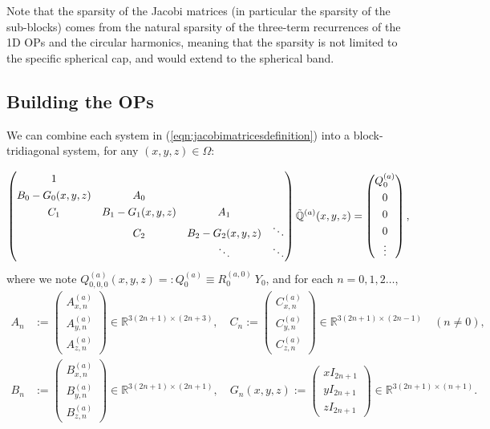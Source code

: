 \documentclass[11pt, oneside]{article}   	%
\newcommand{\R}{\mathbb{R}}
\newcommand{\genjac}{R}
\newcommand{\scop}{Q}
\newcommand{\scopa}{\scop^{(a)}}
\newcommand{\bigscopt}{\mathbb{\tilde{Q}}}
\newcommand{\bigscopta}{\bigscopt^{(a)}}
\newcommand{\ch}{Y}
\begin{document}
Note that the sparsity of the Jacobi matrices (in particular the sparsity of the sub-blocks) comes from the natural sparsity of the three-term recurrences of the 1D OPs and the circular harmonics, meaning that the sparsity is not limited to the specific spherical cap, and would extend to the spherical band.




\subsection{Building the OPs} 

We can combine each system in (\ref{eqn:jacobimatricesdefinition}) into a block-tridiagonal system, for any $(x,y,z) \in \Omega$:

\begin{align*}
	\renewcommand\arraystretch{1.3}
	\begin{pmatrix}
		1 & & & \\
		B_0-G_0(x,y,z) & A_0 & & \\
		C_1 & B_1-G_1(x,y,z) & \quad A_1 \quad & \\
		& C_2 & B_2 - G_2(x,y,z)  & \ddots \\
		& & \ddots &\ddots
	\end{pmatrix}
	\bigscopta(x,y,z) =
		\begin{pmatrix}
	 		\scopa_0 \\ 0 \\ 0 \\ 0 \\ \vdots  \\
		\end{pmatrix},
\end{align*}
where we note $\scopa_{0,0,0}(x,y,z) =: \scopa_0 \equiv \genjac_0^{(a,0)} \: \ch_0$, and for each $n = 0,1,2\dots$,
\begin{align*}
	A_n &:= 
		\begin{pmatrix}
			A^{(a)}_{x,n} \\
			A^{(a)}_{y,n} \\
			A^{(a)}_{z,n}
		\end{pmatrix} \in \R^{3(2n+1)\times(2n+3)}, \quad
	C_n := 
		\begin{pmatrix}
			C^{(a)}_{x,n} \\
			C^{(a)}_{y,n} \\
			C^{(a)}_{z,n}
		\end{pmatrix} \in \R^{3(2n+1)\times(2n-1)} \quad (n \ne 0), \nonumber \\
	B_n &:= 
		\begin{pmatrix}
			B^{(a)}_{x,n} \\
			B^{(a)}_{y,n} \\
			B^{(a)}_{z,n}
		\end{pmatrix} \in \R^{3(2n+1)\times(2n+1)}, \quad
	G_n(x,y,z) := 
		\begin{pmatrix}
			xI_{2n+1} \\
			yI_{2n+1} \\
			zI_{2n+1}
		\end{pmatrix} \in \R^{3(2n+1)\times(n+1)}.
\end{align*}
 
\end{document}
